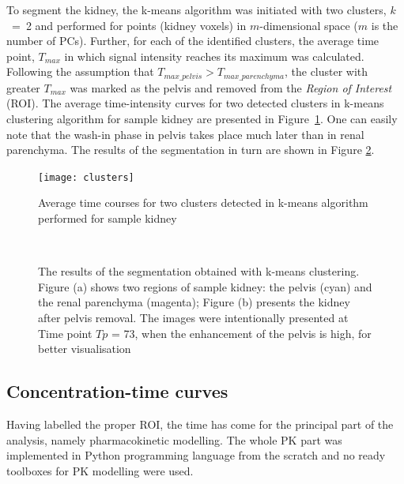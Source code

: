 \vspace{16pt}
To segment the kidney, the k-means algorithm was initiated with two clusters, $k$~=~2 and performed for points (kidney voxels) in $m$-dimensional space ($m$ is the number of PCs).
Further, for each of the identified clusters, the average time point, $T_{max}$ in which signal intensity reaches its maximum was calculated. 
Following the assumption that $T_{max\_pelvis}>T_{max\_parenchyma}$, the cluster with greater $T_{max}$ was marked as the pelvis and removed from the \textit{Region of Interest} (ROI).
The average time-intensity curves for two detected clusters in k-means clustering algorithm for sample kidney are presented in Figure~\ref{fig:clusters}. One can easily note that the wash-in phase in pelvis takes place much later than in renal parenchyma. The results of the segmentation in turn are shown in Figure \ref{fig:segmentation}.  


\begin{figure}[H]
	\centering
	\texttt{[image: clusters]}
	
\caption[Average time courses for two clusters detected in k-means algorithm]{Average time courses for two clusters detected in k-means algorithm performed for sample kidney}
\label{fig:clusters}
\end{figure}

\begin{figure}[H]
\captionsetup[subfloat]{captionskip=0.5cm}
	\centering
	\hspace{0.02\textwidth}
	\\	
\vspace{0.5cm}
\caption[Sample kidney segmentation with k-means clustering]{The results of the segmentation obtained with k-means clustering. Figure (a) shows two regions of sample kidney: the pelvis (cyan) and the renal parenchyma (magenta); Figure (b) presents the kidney after pelvis removal. The images were intentionally presented at Time point $Tp$ = 73, when the enhancement of the pelvis is high, for better visualisation}
\label{fig:segmentation}
\end{figure}

\newpage
\subsection{Concentration-time curves}
Having labelled the proper ROI, the time has come for the principal part of the analysis, namely pharmacokinetic modelling.
The whole PK part was implemented in Python programming language from the scratch and no ready toolboxes for PK modelling were used.

